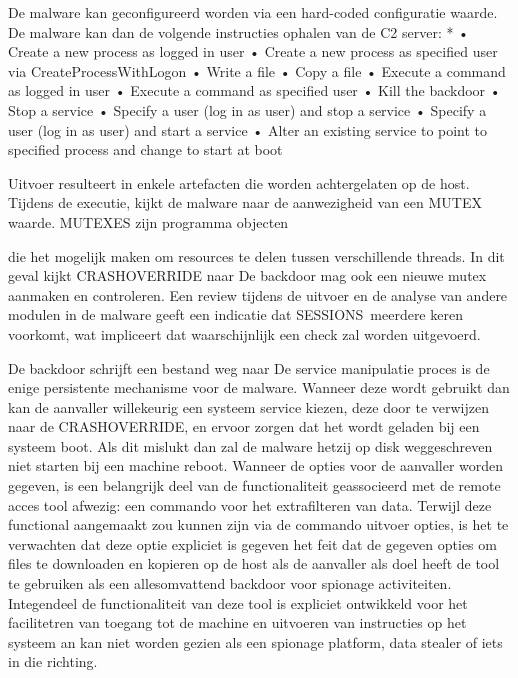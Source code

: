 		De malware kan geconfigureerd worden via een hard-coded configuratie waarde. De malware kan
		dan de volgende instructies ophalen van de C2 server:
		* • Create a new process as logged in user • Create a new process as specified user via
		CreateProcessWithLogon • Write a file • Copy a file • Execute a command as logged in user • Execute
		a command as specified user • Kill the backdoor • Stop a service • Specify a user (log in as user) and
		stop a service • Specify a user (log in as user) and start a service • Alter an existing service to point to
		specified process and change to start at boot
		
		Uitvoer resulteert in enkele artefacten die worden achtergelaten op de host. Tijdens de executie,
		kijkt de malware naar de aanwezigheid van een MUTEX waarde. MUTEXES zijn programma objecten
		
		die het mogelijk maken om resources te delen tussen verschillende threads. In dit geval kijkt
		CRASHOVERRIDE naar %
		De backdoor mag ook een nieuwe mutex aanmaken en controleren. Een review tijdens de uitvoer en
		de analyse van andere modulen in de malware geeft een indicatie dat SESSIONS\1\Windows\
		meerdere keren voorkomt, wat impliceert dat waarschijnlijk een check zal worden uitgevoerd.
		
		De backdoor schrijft een bestand weg naar %
		De service manipulatie proces is de enige persistente mechanisme voor de malware. Wanneer deze
		wordt gebruikt dan kan de aanvaller willekeurig een systeem service kiezen, deze door te verwijzen
		naar de CRASHOVERRIDE, en ervoor zorgen dat het wordt geladen bij een systeem boot. Als dit
		mislukt dan zal de malware hetzij op disk weggeschreven niet starten bij een machine reboot.
		Wanneer de opties voor de aanvaller worden gegeven, is een belangrijk deel van de functionaliteit
		geassocieerd met de remote acces tool afwezig: een commando voor het extrafilteren van data.
		Terwijl deze functional aangemaakt zou kunnen zijn via de commando uitvoer opties, is het te
		verwachten dat deze optie expliciet is gegeven het feit dat de gegeven opties om files te downloaden
		en kopieren op de host als de aanvaller als doel heeft de tool te gebruiken als een allesomvattend
		backdoor voor spionage activiteiten. Integendeel de functionaliteit van deze tool is expliciet
		ontwikkeld voor het facilitetren van toegang tot de machine en uitvoeren van instructies op het
		systeem an kan niet worden gezien als een spionage platform, data stealer of iets in die richting.
		
